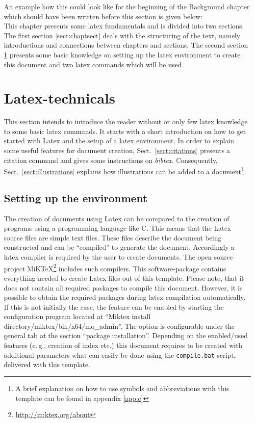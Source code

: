 An example how this could look like for the beginning of the Background chapter which should have been written before this section is given below:\\
This chapter presents some latex fundamentals and is divided into two sections.
The first section \ref{sect:chaptsect} deals with the structuring of the text, namely introductions and connections between chapters and sections.
The second section \ref{sect:latex} presents some basic knowledge on setting up the latex environment to create this document and two latex commands which will be used.


\section{Latex-technicals}
\label{sect:latex}

This section intends to introduce the reader without or only few latex knowledge to some basic latex commands.
It starts with a short introduction on how to get started with Latex and the setup of a latex environment.
In order to explain some useful features for document creation, Sect.~\ref{sect:citations} presents a citation command and gives some instructions on \textit{bibtex}.
Consequently, Sect.~\ref{sect:illustrations} explains how illustrations can be added to a document\footnote{A brief explanation on how to use symbols and abbreviations with this template can be found in appendix \ref{app:c}}.

\subsection{Setting up the environment}
\label{sect:latexenvironment}
The creation of documents using Latex can be compared to the creation of programs using a programming language like C.
This means that the Latex source files are simple text files.
These files describe the document being constructed and can be \enquote{compiled} to generate the document.
Accordingly a latex compiler is required by the user to create documents.
The open source project MiKTeX\footnote{\url{http://miktex.org/about}} includes such compilers.
This software-package contains everything needed to create Latex files out of this template.
Please note, that it does not contain all required packages to compile this document.
However, it is possible to obtain the required packages during latex compilation automatically.
If this is not initially the case, the feature can be enabled by starting the configuration program located at \enquote{Miktex install directory/miktex/bin/x64/mo\_admin}.
The option is configurable under the general tab at the section \enquote{package installation}.
Depending on the enabled/used features (e.\,g., creation of index etc.) this document requires to be created with additional parameters what can easily be done using the \texttt{compile.bat} script, delivered with this template.

